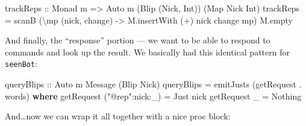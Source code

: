 \documentclass[]{article}
\newenvironment{Shaded}{}{}
\newcommand{\KeywordTok}[1]{\textcolor[rgb]{0.00,0.44,0.13}{\textbf{{#1}}}}
\newcommand{\DataTypeTok}[1]{\textcolor[rgb]{0.56,0.13,0.00}{{#1}}}
\newcommand{\StringTok}[1]{\textcolor[rgb]{0.25,0.44,0.63}{{#1}}}
\newcommand{\OtherTok}[1]{\textcolor[rgb]{0.00,0.44,0.13}{{#1}}}
\newcommand{\FunctionTok}[1]{\textcolor[rgb]{0.02,0.16,0.49}{{#1}}}
\newcommand{\NormalTok}[1]{{#1}}
\begin{document}
\begin{Shaded}
\begin{Highlighting}[]
\OtherTok{trackReps ::} \DataTypeTok{Monad} \NormalTok{m }\OtherTok{=>} \DataTypeTok{Auto} \NormalTok{m (}\DataTypeTok{Blip} \NormalTok{(}\DataTypeTok{Nick}\NormalTok{, }\DataTypeTok{Int}\NormalTok{)) (}\DataTypeTok{Map} \DataTypeTok{Nick} \DataTypeTok{Int}\NormalTok{)}
\NormalTok{trackReps }\FunctionTok{=} \NormalTok{scanB (\textbackslash{}mp (nick, change) }\OtherTok{->} \NormalTok{M.insertWith (}\FunctionTok{+}\NormalTok{) nick change mp) M.empty}
\end{Highlighting}
\end{Shaded}

And finally, the ``response'' portion --- we want to be able to respond
to commands and look up the result. We basically had this identical
pattern for \texttt{seenBot}:

\begin{Shaded}
\begin{Highlighting}[]
\OtherTok{queryBlips ::} \DataTypeTok{Auto} \NormalTok{m }\DataTypeTok{Message} \NormalTok{(}\DataTypeTok{Blip} \DataTypeTok{Nick}\NormalTok{)}
\NormalTok{queryBlips }\FunctionTok{=} \NormalTok{emitJusts (getRequest }\FunctionTok{.} \NormalTok{words)}
  \KeywordTok{where}
    \NormalTok{getRequest (}\StringTok{"@rep"}\FunctionTok{:}\NormalTok{nick}\FunctionTok{:}\NormalTok{_) }\FunctionTok{=} \DataTypeTok{Just} \NormalTok{nick}
    \NormalTok{getRequest _                }\FunctionTok{=} \DataTypeTok{Nothing}
\end{Highlighting}
\end{Shaded}

And\ldots{}now we can wrap it all together with a nice proc block:
\end{document}
